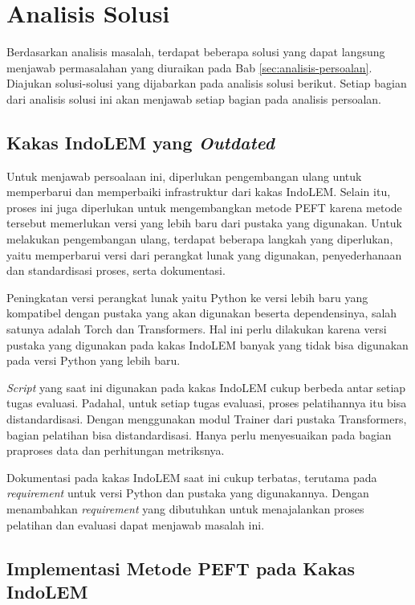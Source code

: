\section{Analisis Solusi}

Berdasarkan analisis masalah, terdapat beberapa solusi yang dapat langsung menjawab permasalahan yang diuraikan pada Bab \ref{sec:analisis-persoalan}. Diajukan solusi-solusi yang dijabarkan pada analisis solusi berikut. Setiap bagian dari analisis solusi ini akan menjawab setiap bagian pada analisis persoalan.

\subsection{Kakas IndoLEM yang \textit{Outdated}}

Untuk menjawab persoalaan ini, diperlukan pengembangan ulang untuk memperbarui dan memperbaiki infrastruktur dari kakas IndoLEM. Selain itu, proses ini juga diperlukan untuk mengembangkan metode PEFT karena metode tersebut memerlukan versi yang lebih baru dari pustaka yang digunakan. Untuk melakukan pengembangan ulang, terdapat beberapa langkah yang diperlukan, yaitu memperbarui versi dari perangkat lunak yang digunakan, penyederhanaan dan standardisasi proses, serta dokumentasi.

Peningkatan versi perangkat lunak yaitu Python ke versi lebih baru yang kompatibel dengan pustaka yang akan digunakan beserta dependensinya, salah satunya adalah Torch dan Transformers. Hal ini perlu dilakukan karena versi pustaka yang digunakan pada kakas IndoLEM banyak yang tidak bisa digunakan pada versi Python yang lebih baru.

\textit{Script} yang saat ini digunakan pada kakas IndoLEM cukup berbeda antar setiap tugas evaluasi. Padahal, untuk setiap tugas evaluasi, proses pelatihannya itu bisa distandardisasi. Dengan menggunakan modul Trainer dari pustaka Transformers, bagian pelatihan bisa distandardisasi. Hanya perlu menyesuaikan pada bagian praproses data dan perhitungan metriksnya.

Dokumentasi pada kakas IndoLEM saat ini cukup terbatas, terutama pada \textit{requirement} untuk versi Python dan pustaka yang digunakannya. Dengan menambahkan \textit{requirement} yang dibutuhkan untuk menajalankan proses pelatihan dan evaluasi dapat menjawab masalah ini.

\subsection{Implementasi Metode PEFT pada Kakas IndoLEM}


